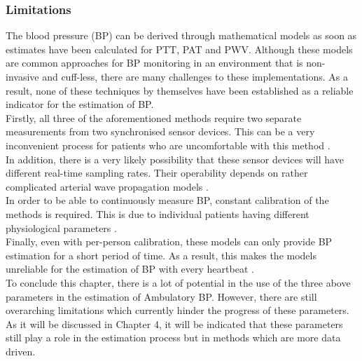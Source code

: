 \documentclass[11pt, a4paper]{article}
\begin{document}
\subsubsection{Limitations}
The blood pressure (BP) can be derived through mathematical models as soon as estimates have been calculated for PTT, PAT and PWV. Although these models are common approaches for BP monitoring in an environment that is non-invasive and cuff-less, there are many challenges to these implementations. As a result, none of these techniques by themselves have been established as a reliable indicator for the estimation of BP. \\ \newline \noindent Firstly, all three of the aforementioned methods require two separate measurements from two synchronised sensor devices. This can be a very inconvenient process for patients who are uncomfortable with this method \cite{Jeong2021}. \\ \newline \noindent In addition, there is a very likely possibility that these sensor devices will have different real-time sampling rates. Their operability depends on rather complicated arterial wave propagation models \cite{ElHajj2020}. \\ \newline \noindent In order to be able to continuously measure BP, constant calibration of the methods is required. This is due to individual patients having different physiological parameters \cite{Jeong2021}. \\ \newline \noindent Finally, even with per-person calibration, these models can only provide BP estimation for a short period of time. As a result, this makes the models unreliable for the estimation of BP with every heartbeat \cite{ElHajj2020}. \\ \newline \noindent To conclude this chapter, there is a lot of potential in the use of the three above parameters in the estimation of Ambulatory BP. However, there are still overarching limitations which currently hinder the progress of these parameters. As it will be discussed in Chapter 4, it will be indicated that these parameters still play a role in the estimation process but in methods which are more data driven.
\newpage 
\end{document}
